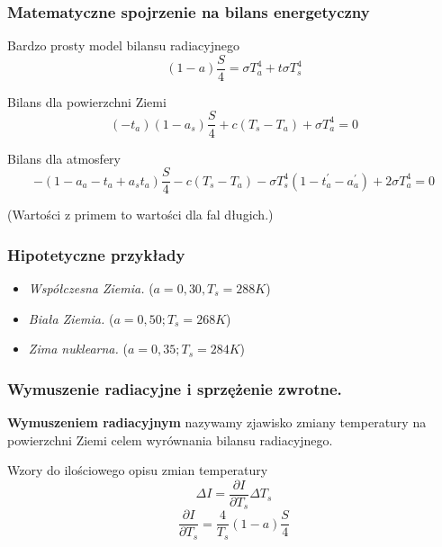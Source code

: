 \documentclass{beamer}
\begin{document}
\begin{frame}
	\frametitle{Matematyczne spojrzenie na bilans energetyczny}
	\begin{block}{Bardzo prosty model bilansu radiacyjnego}
		\[(1-a)\frac{S}{4} = \sigma T_a^4 + t\sigma T_s^4
		\]
	\end{block}
	\begin{block}{Bilans dla powierzchni Ziemi}
		\[(-t_a)(1-a_s)\frac{S}{4}+c(T_s - T_a)+\sigma T_a^4 =0
		\]
	\end{block}
	\begin{block}{Bilans dla atmosfery}
		\[-(1- a_a-t_a+a_st_a)\frac{S}{4} - c(T_s - T_a) - \sigma T_s^4
		(1-t_a^{'}-a_a^{'}) + 2\sigma T_a^4=0
		\]
	\end{block}
	\scriptsize{(Wartości z primem to wartości dla fal długich.)}
	
\end{frame}

\begin{frame}
	\frametitle{Hipotetyczne przykłady}
	\begin{itemize}
		\item \textit{Współczesna Ziemia.} ($a=0,30, T_s=288K$)
		\item \textit{Biała Ziemia.} ($a = 0,50;T_s=268K$)
		\item \textit{Zima nuklearna.} ($a=0,35; T_s=284K$)
	\end{itemize}
	
\end{frame}

\begin{frame}
	\frametitle{Wymuszenie radiacyjne i sprzężenie zwrotne.}
	\textbf{Wymuszeniem radiacyjnym} nazywamy zjawisko zmiany temperatury na powierzchni Ziemi celem wyrównania bilansu radiacyjnego. 
	\begin{block}{Wzory do ilościowego opisu zmian temperatury}
		\[\Delta I = \frac{\partial I}{\partial T_s}\Delta T_s
		\]
		\[\frac{\partial I}{\partial T_s} = \frac{4}{T_s}(1-a)\frac{S}{4}
		\]
		
	\end{block}
\end{frame}
\end{document}
